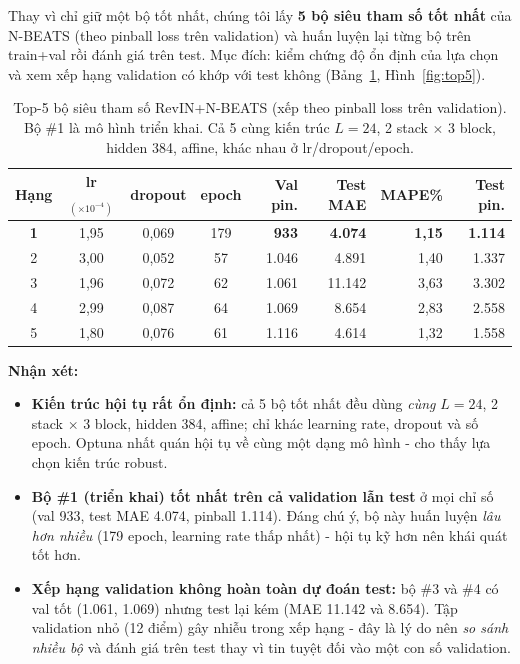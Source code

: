 \documentclass[12pt, a4paper]{report}
\begin{document}
Thay vì chỉ giữ một bộ tốt nhất, chúng tôi lấy \textbf{5 bộ siêu tham số tốt nhất} của N-BEATS (theo pinball loss trên validation) và huấn luyện lại từng bộ trên train+val rồi đánh giá trên test. Mục đích: kiểm chứng độ ổn định của lựa chọn và xem xếp hạng validation có khớp với test không (Bảng~\ref{tab:top5}, Hình~\ref{fig:top5}).

\begin{table}[H]
\centering
\scriptsize
\caption{Top-5 bộ siêu tham số RevIN+N-BEATS (xếp theo pinball loss trên validation). Bộ \#1 là mô hình triển khai. Cả 5 cùng kiến trúc $L{=}24$, 2 stack $\times$ 3 block, hidden 384, affine, khác nhau ở lr/dropout/epoch.}
\label{tab:top5}
\begin{tabular}{|c|c|c|c|r|r|r|r|}
\hline
\rowcolor{gray!18}
Hạng & lr$_{(\times 10^{-4})}$ & dropout & epoch & Val pin. & Test MAE & MAPE\% & Test pin. \\
\hline
\rowcolor{gray!18}
\textbf{1} & 1,95 & 0,069 & 179 & \textbf{933} & \textbf{4.074} & \textbf{1,15} & \textbf{1.114} \\
2 & 3,00 & 0,052 & 57 & 1.046 & 4.891 & 1,40 & 1.337 \\
3 & 1,96 & 0,072 & 62 & 1.061 & 11.142 & 3,63 & 3.302 \\
4 & 2,99 & 0,087 & 64 & 1.069 & 8.654 & 2,83 & 2.558 \\
5 & 1,80 & 0,076 & 61 & 1.116 & 4.614 & 1,32 & 1.558 \\
\hline
\end{tabular}
\end{table}

\textbf{Nhận xét:}
\begin{itemize}
  \item \textbf{Kiến trúc hội tụ rất ổn định:} cả 5 bộ tốt nhất đều dùng \textit{cùng} $L=24$, 2 stack $\times$ 3 block, hidden 384, affine; chỉ khác learning rate, dropout và số epoch. Optuna nhất quán hội tụ về cùng một dạng mô hình - cho thấy lựa chọn kiến trúc robust.
  \item \textbf{Bộ \#1 (triển khai) tốt nhất trên cả validation lẫn test} ở mọi chỉ số (val 933, test MAE 4.074, pinball 1.114). Đáng chú ý, bộ này huấn luyện \textit{lâu hơn nhiều} (179 epoch, learning rate thấp nhất) - hội tụ kỹ hơn nên khái quát tốt hơn.
  \item \textbf{Xếp hạng validation không hoàn toàn dự đoán test:} bộ \#3 và \#4 có val tốt (1.061, 1.069) nhưng test lại kém (MAE 11.142 và 8.654). Tập validation nhỏ (12 điểm) gây nhiễu trong xếp hạng - đây là lý do nên \emph{so sánh nhiều bộ} và đánh giá trên test thay vì tin tuyệt đối vào một con số validation.
\end{itemize}
\end{document}
